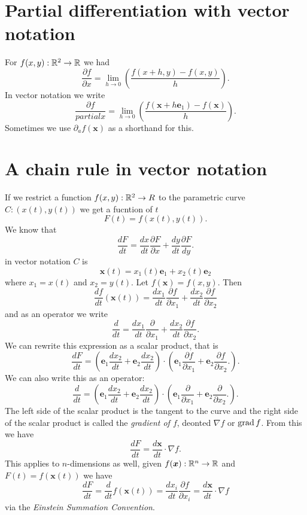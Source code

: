 \section{Partial differentiation with vector notation}

For
$f(x, y) : \mathbb{R}^2 \to \mathbb{R}$
we had
\[ \frac{\partial f}{\partial x} = \lim_{h \to 0} \left( \frac{f(x + h, y) - f(x, y)}{h} \right). \]
In vector notation we write 
\[ \frac{\partial f}{partial x} = \lim_{h \to 0} \left( \frac{f(\bm x + h\bm e_1) - f(\bm x)}{h} \right). \]
Sometimes we use
$\partial_a f(\bm x)$
as a shorthand for this.

\section{A chain rule in vector notation}

If we restrict a function 
$f(x, y) : \mathbb{R}^2 \to R$ 
to the parametric curve
$C : (x(t), y(t))$
we get a fucntion of $t$
\[ F(t) = f(x(t), y(t)). \]
We know that
\[ \frac{dF}{dt} = \frac{dx}{dt} \frac{\partial F}{\partial x} + \frac{dy}{dt} \frac{\partial F}{dy}. \]
in vector notation $C$ is
\[ \bm x(t) = x_1(t) \bm e_1 + x_2(t) \bm e_2 \]
where $x_1 = x(t)$ and $x_2 = y(t)$. Let $f(\bm x) = f(x, y)$. Then
\[ \frac{df}{dt} (\bm x(t)) = \frac{d x_1}{dt} \frac{\partial f}{\partial x_1} + \frac{dx_2}{dt} \frac{\partial f}{\partial x_2} \]
and as an operator we write
\[ \frac{d}{dt} = \frac{dx_1}{dt} \frac{\partial}{\partial x_1}  + \frac{dx_2}{dt} \frac{\partial f}{\partial x_2}. \]
We can rewrite this expression as a scalar product, that is
\[ 
    \frac{dF}{dt} =
    \left(
        \bm e_1 \frac{dx_2}{dt} + \bm e_2 \frac{dx_2}{dt}
    \right)
    \cdot
    \left(
        \bm e_1 \frac{\partial f}{\partial x_1} + \bm e_2 \frac{\partial f}{\partial x_2}.
    \right).
\]
We can also write this as an operator:
\[ 
    \frac{d}{dt} =
    \left(
        \bm e_1 \frac{dx_2}{dt} + \bm e_2 \frac{dx_2}{dt}
    \right)
    \cdot
    \left(
        \bm e_1 \frac{\partial}{\partial x_1} + \bm e_2 \frac{\partial}{\partial x_2}.
    \right).
\]
The left side of the scalar product is the tangent to the curve and the right side of the scalar product is called the \emph{gradient of $f$}, deonted $\nabla f$ or $\operatorname{grad} f$. From this we have
\[ \frac{dF}{dt} = \frac{d\bm x}{dt} \cdot \nabla f. \]
This applies to $n$-dimensions as well, given $f(\bm x) : \mathbb{R}^n \to \mathbb{R}$ and $F(t) = f(\bm x(t))$ we have
\[ \frac{dF}{dt} = \frac{d}{dt} f(\bm x(t)) = \frac{dx_i}{dt} \frac{\partial f}{\partial x_i} = \frac{d\bm x}{dt} \cdot \nabla{f} \] 
via the \emph{Einstein Summation Convention}.

